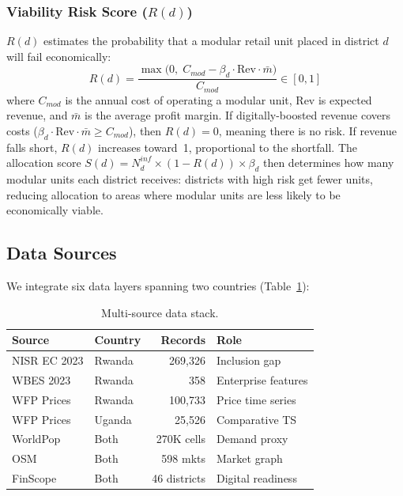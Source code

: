 \documentclass{article}
\begin{document}
\subsubsection{Viability Risk Score ($R(d)$)}
$R(d)$ estimates the probability that a modular retail unit placed in district $d$ will fail economically:
\begin{equation}
    R(d) = \frac{\max\!\bigl(0,\; C_{\textit{mod}} - \beta_d \cdot \text{Rev} \cdot \bar{m}\bigr)}{C_{\textit{mod}}} \in [0,1]
    \label{eq:risk}
\end{equation}
where $C_{\textit{mod}}$ is the annual cost of operating a modular unit, $\text{Rev}$ is expected revenue, and $\bar{m}$ is the average profit margin.
If digitally-boosted revenue covers costs ($\beta_d \cdot \text{Rev} \cdot \bar{m} \geq C_{\textit{mod}}$), then $R(d) = 0$, meaning there is no risk.
If revenue falls short, $R(d)$ increases toward~1, proportional to the shortfall.
The allocation score $S(d) = N_d^{\textit{inf}} \times (1 - R(d)) \times \beta_d$ then determines how many modular units each district receives: districts with high risk get fewer units, reducing allocation to areas where modular units are less likely to be economically viable.

\subsection{Data Sources}

We integrate six data layers spanning two countries (Table~\ref{tab:data}):

\begin{table}[t]
    \centering
    \caption{Multi-source data stack.}
    \label{tab:data}
    \begin{tabular}{@{}llrl@{}}
        \toprule
        Source & Country & Records & Role \\
        \midrule
        NISR EC 2023 & Rwanda & 269,326 & Inclusion gap \\
        WBES 2023 & Rwanda & 358 & Enterprise features \\
        WFP Prices & Rwanda & 100,733 & Price time series \\
        WFP Prices & Uganda & 25,526 & Comparative TS \\
        WorldPop & Both & 270K cells & Demand proxy \\
        OSM & Both & 598 mkts & Market graph \\
        FinScope & Both & 46 districts & Digital readiness \\
        \bottomrule
    \end{tabular}
\end{table}
\end{document}
